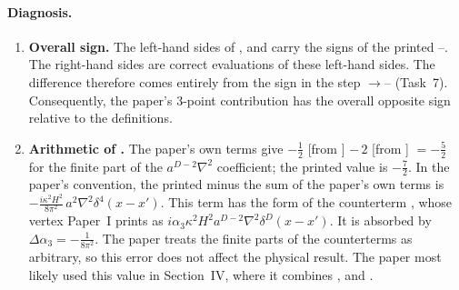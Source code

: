 \paragraph{Diagnosis.}
\begin{enumerate}[leftmargin=1.5em,itemsep=2pt]
\item \textbf{Overall sign.} The left-hand sides of ,  and  carry the signs of the printed --.
The right-hand sides are correct evaluations of these left-hand sides.
The difference therefore comes entirely from the sign in the step $\to$-- (Task~7).
Consequently, the paper's 3-point contribution has the overall opposite sign relative to the definitions.
\item \textbf{Arithmetic of .} The paper's own terms give $-\frac12$ [from ] $-\,2$ [from ] $=-\frac52$ for the finite part of the $a^{D-2}\nabla^2$ coefficient; the printed value is $-\frac72$.
In the paper's convention, the printed  minus the sum of the paper's own terms is $-\frac{i\kappa^2H^2}{8\pi^2}\,a^2\nabla^2\delta^4(x-x')$.
This term has the form of the counterterm , whose vertex Paper~I prints as $i\alpha_3\kappa^2H^2a^{D-2}\nabla^2\delta^D(x-x')$.
It is absorbed by $\Delta\alpha_3=-\frac{1}{8\pi^2}$.
The paper treats the finite parts of the counterterms as arbitrary, so this error does not affect the physical result.
The paper most likely used this value in Section~IV, where it combines ,  and .
\end{enumerate}

